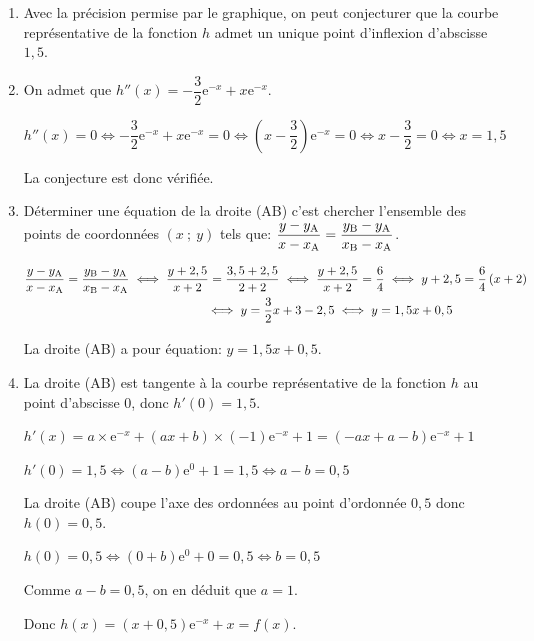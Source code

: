 \documentclass[10pt]{article}
\providecommand{\e}{{\mathrm{e}}}
\begin{document}
\begin{enumerate}
\item Avec la précision permise par le graphique, on peut conjecturer que la courbe représentative de la fonction $h$ admet un unique point d'inflexion d'abscisse  $1,5$.

\item On admet que $h''(x) = - \dfrac32 \e^{- x} + x\e^{- x}$.

$h''(x)=0
\iff
-\dfrac{3}{2}\e^{-x}+x\e^{-x}=0
\iff
\left (x-\dfrac{3}{2}\right )\e^{-x}=0
\iff
x-\dfrac{3}{2}=0
\iff
x=1,5$

La conjecture est donc vérifiée.

\item Déterminer une équation de la droite (AB) c'est chercher l'ensemble des points de coordonnées $(x~;~y)$ tels que:
$\dfrac{y-y_{\text A}}{x-x_{\text A}} = \dfrac{y_{\text B}-y_{\text A}}{x_{\text B}-x_{\text A}}$.

$\begin{gathered}\dfrac{y-y_{\text A}}{x-x_{\text A}} = \dfrac{y_{\text B}-y_{\text A}}{x_{\text B}-x_{\text A}}
\iff
\dfrac{y+2,5}{x+2} = \dfrac{3,5 + 2,5}{2 + 2}
\iff
\dfrac{y+2,5}{x+2} = \dfrac{6}{4}
\iff
y+2,5 = \dfrac{6}{4}\left (x+2\right )\\
\phantom{\dfrac{y-y_{\text A}}{x-x_{\text A}} = \dfrac{y_{\text B}-y_{\text A}}{x_{\text B}-x_{\text A}}}
\iff
y=\dfrac{3}{2}x +3-2,5
\iff
y=1,5x + 0,5\end{gathered}$

La droite (AB) a pour équation: $y =1,5x + 0,5$.

\item La droite (AB) est tangente à la courbe représentative de la fonction $h$ au point d'abscisse 0, donc $h'(0)=1,5$.

$h'(x)=a\times \e^{-x} +  (ax+b)\times (-1)\e^{-x}+1
=  (-ax+a-b )\e^{-x}+1$

$h'(0)=1,5
\iff
(a-b)\e^{0}+1=1,5
\iff
a-b=0,5$

La droite (AB) coupe l'axe des ordonnées au point d'ordonnée $0,5$ donc $h(0)=0,5$.

$h(0)=0,5
\iff
(0+b)\e^{0}+0=0,5
\iff
b=0,5$

Comme $a-b=0,5$, on en déduit que $a=1$.

Donc $h(x)=(x+0,5)\e^{-x}+x=f(x)$.
\end{enumerate}

\bigskip
\end{document}
